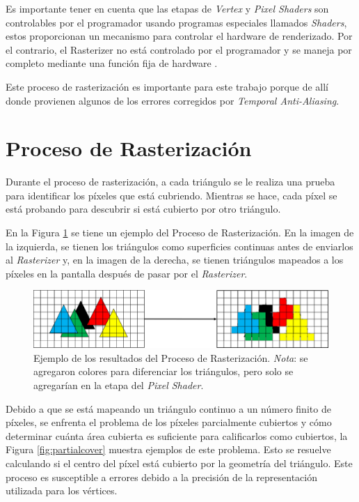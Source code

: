 \documentclass[pregrado]{tesis-usb} %
\begin{document}
Es importante tener en cuenta que las etapas de \textit{Vertex} y \textit{Pixel Shaders} son controlables por el programador usando programas especiales llamados \textit{Shaders}, estos proporcionan un mecanismo para controlar el hardware de renderizado. Por el contrario, el Rasterizer no está controlado por el programador y se maneja por completo mediante una función fija de hardware \cite{Doggett2017EDAF80}. 

Este proceso de rasterización es importante para este trabajo porque de allí donde provienen algunos de los errores corregidos por \textit{Temporal Anti-Aliasing}.


\section{Proceso de Rasterización}
Durante el proceso de rasterización, a cada triángulo se le realiza una prueba para identificar los píxeles que está cubriendo. Mientras se hace, cada píxel se está probando para descubrir si está cubierto por otro triángulo.

En la Figura \ref{fig:rasterizationproc} se tiene un ejemplo del Proceso de Rasterización. En la imagen de la izquierda, se tienen los triángulos como superficies continuas antes de enviarlos al \textit{Rasterizer} y, en la imagen de la derecha, se tienen triángulos mapeados a los píxeles en la pantalla después de pasar por el \textit{Rasterizer}.

\begin{figure}[!hbt]
	\centering
	\includegraphics[scale=0.75]{images/rasterization_process.png} 
	\caption{Ejemplo de los resultados del Proceso de Rasterización.
		\emph{Nota}: se agregaron colores para diferenciar los triángulos, pero solo se agregarían en la etapa del \textit{Pixel Shader}.
	}\label{fig:rasterizationproc}
\end{figure}

Debido a que se está mapeando un triángulo continuo a un número finito de píxeles, se enfrenta el problema de los píxeles parcialmente cubiertos y cómo determinar cuánta área cubierta es suficiente para calificarlos como cubiertos, la Figura \ref{fig:partialcover} muestra ejemplos de este problema. Esto se resuelve calculando si el centro del píxel está cubierto por la geometría del triángulo. Este proceso es susceptible a errores debido a la precisión de la representación utilizada para los vértices.
\end{document}
